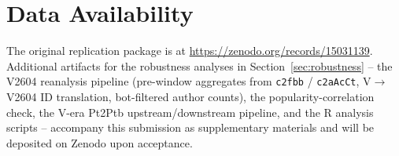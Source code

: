 \documentclass[10pt,conference]{IEEEtran}
\begin{document}







\section*{Data Availability}
The original replication package is at
\url{https://zenodo.org/records/15031139}.  Additional artifacts for the
robustness analyses in Section~\ref{sec:robustness} -- the V2604
reanalysis pipeline (pre-window aggregates from \texttt{c2fbb} /
\texttt{c2aAcCt}, V$\to$V2604 ID translation, bot-filtered author
counts), the popularity-correlation check, the V-era Pt2Ptb
upstream/downstream pipeline, and the R analysis scripts -- accompany
this submission as supplementary materials and will be deposited on
Zenodo upon acceptance.

\balance



\end{document}
